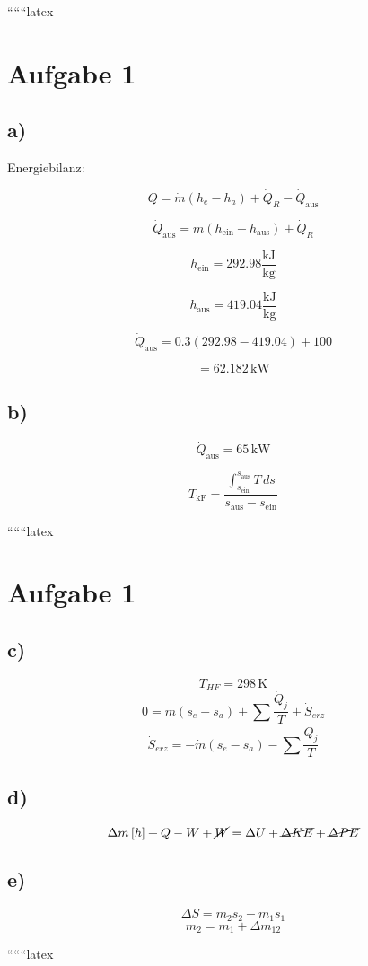 
``````latex


\section*{Aufgabe 1}

\subsection*{a)}

Energiebilanz:

\[
Q = \dot{m} (h_e - h_a) + \dot{Q}_R - \dot{Q}_{\text{aus}}
\]

\[
\dot{Q}_{\text{aus}} = \dot{m} (h_{\text{ein}} - h_{\text{aus}}) + \dot{Q}_{R}
\]

\[
h_{\text{ein}} = 292.98 \frac{\text{kJ}}{\text{kg}}
\]

\[
h_{\text{aus}} = 419.04 \frac{\text{kJ}}{\text{kg}}
\]

\[
\dot{Q}_{\text{aus}} = 0.3 \left( 292.98 - 419.04 \right) + 100
\]

\[
= 62.182 \, \text{kW}
\]

\subsection*{b)}

\[
\dot{Q}_{\text{aus}} = 65 \, \text{kW}
\]

\[
\overline{T}_{\text{kF}} = \frac{\int_{s_{\text{ein}}}^{s_{\text{aus}}} T \, ds}{s_{\text{aus}} - s_{\text{ein}}}
\]

``````latex

\section*{Aufgabe 1}

\subsection*{c)}
\[
T_{HF} = 298 \, \text{K}
\]
\[
0 = \dot{m} \left( s_e - s_a \right) + \sum \frac{\dot{Q}_j}{T} + \dot{S}_{erz}
\]
\[
\dot{S}_{erz} = -\dot{m} \left( s_e - s_a \right) - \sum \frac{\dot{Q}_j}{T}
\]

\subsection*{d)}
\[
\Delta m \left[ h \right] + Q - W + \cancel{W} = \Delta U + \cancel{\Delta KE} + \cancel{\Delta PE}
\]

\subsection*{e)}
\[
\Delta S = m_2 s_2 - m_1 s_1
\]
\[
m_2 = m_1 + \Delta m_{12}
\]

``````latex


